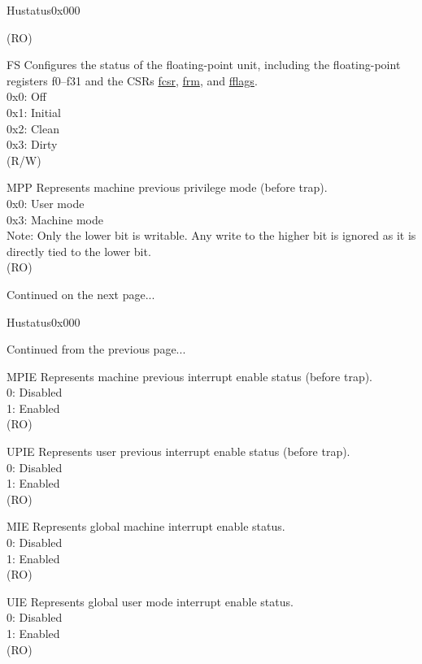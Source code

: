 \begin{register}{H}{ustatus}{0x000}
\begin{regdesc}
\begin{reglist}
(RO)
\label{fielddesc:USTATUS_FS}\item [FS] Configures the status of the floating-point unit, including the floating-point registers f0–f31 and the CSRs \hyperref[regdesc:FCSR]{fcsr}, \hyperref[regdesc:FCSR]{frm}, and \hyperref[regdesc:FFLAGS]{fflags}. \\
0x0: Off\\
0x1: Initial\\
0x2: Clean\\
0x3: Dirty\\
(R/W)
\label{fielddesc:USTATUSMPP}\item [MPP] Represents machine previous privilege mode (before trap).\\
0x0: User mode\\
0x3: Machine mode\\
Note: Only the lower bit is writable. Any write to the higher bit is ignored as it is directly tied to the lower bit.\\
(RO)
\item [Continued on the next page...]
\end{reglist}\end{regdesc}
\end{register}
\addtocounter{Regfloat}{-1}
\begin{register}{H}{ustatus}{0x000}
\begin{regdesc}\begin{reglist}
\item [Continued from the previous page...]
\label{fielddesc:USTATUSMPIE}\item [MPIE] Represents machine previous interrupt enable status (before trap). \\
0: Disabled\\
1: Enabled\\
(RO)
\label{fielddesc:USTATUSUPIE}\item [UPIE] Represents user previous interrupt enable status (before trap). \\
0: Disabled\\
1: Enabled\\
(RO)
\label{fielddesc:USTATUSMIE}\item [MIE] Represents global machine interrupt enable status.\\
0: Disabled\\
1: Enabled\\
(RO)
\label{fielddesc:USTATUSUIE}\item [UIE] Represents global user mode interrupt enable status. \\
0: Disabled\\
1: Enabled\\
(RO)
\end{reglist}\end{regdesc}
\end{register}

